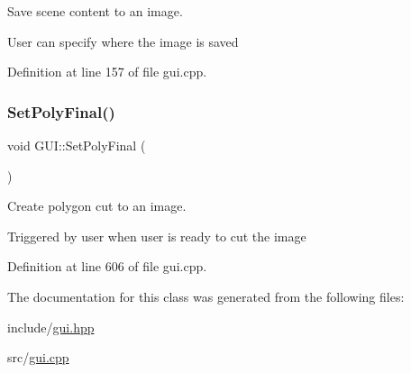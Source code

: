 Save scene content to an image. 

User can specify where the image is saved 

Definition at line 157 of file gui.\+cpp.

\mbox{\label{classGUI_a6bf2d3ef382340365b5693245a2bd955}} 
\subsubsection{\texorpdfstring{Set\+Poly\+Final()}{SetPolyFinal()}}
{\footnotesize\ttfamily void G\+U\+I\+::\+Set\+Poly\+Final (\begin{DoxyParamCaption}{ }\end{DoxyParamCaption})}



Create polygon cut to an image. 

Triggered by user when user is ready to cut the image 

Definition at line 606 of file gui.\+cpp.



The documentation for this class was generated from the following files\+:\begin{DoxyCompactItemize}
\item 
include/\mbox{\hyperlink{gui_8hpp}{gui.\+hpp}}\item 
src/\mbox{\hyperlink{gui_8cpp}{gui.\+cpp}}\end{DoxyCompactItemize}
